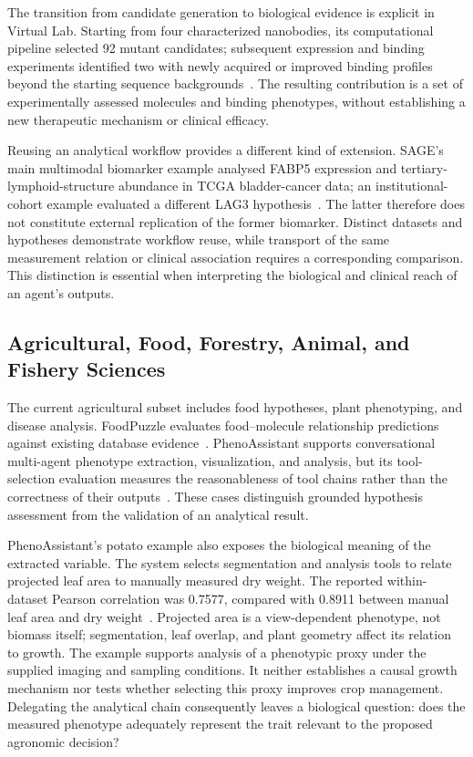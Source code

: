The transition from candidate generation to biological evidence is explicit in Virtual Lab. Starting from four characterized nanobodies, its computational pipeline selected 92 mutant candidates; subsequent expression and binding experiments identified two with newly acquired or improved binding profiles beyond the starting sequence backgrounds~\cite{asd0054}. The resulting contribution is a set of experimentally assessed molecules and binding phenotypes, without establishing a new therapeutic mechanism or clinical efficacy.

Reusing an analytical workflow provides a different kind of extension. SAGE's main multimodal biomarker example analysed FABP5 expression and tertiary-lymphoid-structure abundance in TCGA bladder-cancer data; an institutional-cohort example evaluated a different LAG3 hypothesis~\cite{asd0828}. The latter therefore does not constitute external replication of the former biomarker. Distinct datasets and hypotheses demonstrate workflow reuse, while transport of the same measurement relation or clinical association requires a corresponding comparison. This distinction is essential when interpreting the biological and clinical reach of an agent's outputs.

\subsection{Agricultural, Food, Forestry, Animal, and Fishery Sciences}

The current agricultural subset includes food hypotheses, plant phenotyping, and disease analysis. FoodPuzzle evaluates food--molecule relationship predictions against existing database evidence~\cite{asd0695}. PhenoAssistant supports conversational multi-agent phenotype extraction, visualization, and analysis, but its tool-selection evaluation measures the reasonableness of tool chains rather than the correctness of their outputs~\cite{asd0510}. These cases distinguish grounded hypothesis assessment from the validation of an analytical result.

PhenoAssistant's potato example also exposes the biological meaning of the extracted variable. The system selects segmentation and analysis tools to relate projected leaf area to manually measured dry weight. The reported within-dataset Pearson correlation was 0.7577, compared with 0.8911 between manual leaf area and dry weight~\cite{asd0510}. Projected area is a view-dependent phenotype, not biomass itself; segmentation, leaf overlap, and plant geometry affect its relation to growth. The example supports analysis of a phenotypic proxy under the supplied imaging and sampling conditions. It neither establishes a causal growth mechanism nor tests whether selecting this proxy improves crop management. Delegating the analytical chain consequently leaves a biological question: does the measured phenotype adequately represent the trait relevant to the proposed agronomic decision?

